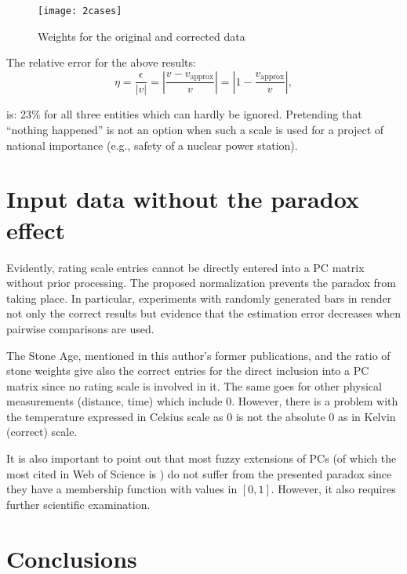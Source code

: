 \documentclass [12pt]{article}
\begin{document}
\begin{figure}[h]
\centering
\texttt{[image: 2cases]}
\caption[Weights for the original and corrected data]{Weights for the original and corrected data}
\label{fig:2cases}
\end{figure}



\noindent The relative error for the above results:
$$
    \eta = \frac{\epsilon}{|v|} = \left| \frac{v-v_\text{approx}}{v} \right| = \left| 1 - \frac{v_\text{approx}}{v} \right|, 
$$

\noindent is: 23\% for all three entities which can hardly be ignored. Pretending that ``nothing happened'' is not an option when such a scale is used for a project of national importance (e.g., safety of a nuclear power station).\\

\section{Input data without the paradox effect}

Evidently, rating scale entries cannot be directly entered into a PC matrix without prior processing. The proposed  normalization prevents the paradox from taking place. In particular, experiments with randomly generated bars in \cite{Kocz1996, Kocz1998} render not only the correct results but evidence that the estimation error decreases when pairwise comparisons are used.

The Stone Age, mentioned in this author's former publications, and the ratio of stone weights give also the correct entries for the direct inclusion into a PC matrix since no rating scale is involved in it. The same goes for other physical measurements (distance, time) which include 0. However, there is a problem with the temperature expressed in Celsius scale as 0 is not the absolute 0 as in Kelvin (correct) scale.

It is also important to point out that most fuzzy extensions of PCs (of which the most cited in Web of Science is \cite{VP1983}) do not suffer from the presented paradox since they have a membership function with values in $[0,1]$. However, it also requires further scientific examination.

\section{Conclusions}
\end{document}
